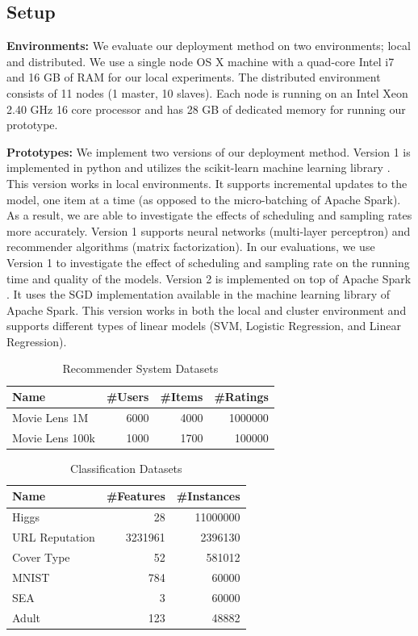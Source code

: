 \documentclass{vldb}
\begin{document}
\subsection{Setup}\label{subsec:setup}
\textbf{Environments:} We evaluate our deployment method on two environments; local and distributed.
We use a single node OS X machine with  a quad-core Intel i7 and 16 GB of RAM for our local experiments.
The distributed environment consists of 11 nodes (1 master, 10 slaves).
Each node is running on an Intel Xeon 2.40 GHz 16 core processor and has 28 GB of dedicated memory for running our prototype.

\textbf{Prototypes:} We implement two versions of our deployment method.
Version 1 is implemented in python and utilizes the scikit-learn machine learning library \cite{sklearn_api}.
This version works in local environments.
It supports incremental updates to the model, one item at a time (as opposed to the micro-batching of Apache Spark).
As a result, we are able to investigate the effects of scheduling and sampling rates more accurately.
Version 1 supports neural networks (multi-layer perceptron) and recommender algorithms (matrix factorization).
In our evaluations, we use Version 1 to investigate the effect of scheduling and sampling rate on the running time and quality of the models.
Version 2 is implemented on top of Apache Spark \cite{zaharia2010spark}.
It uses the SGD implementation available in the machine learning library of Apache Spark.
This version works in both the local and cluster environment and supports different types of linear models (SVM, Logistic Regression, and Linear Regression).

\begin{table}\centering
\begin{tabular}{lrrr}
 \toprule
Name & \#Users & \#Items & \#Ratings
\\\midrule 
Movie Lens 1M  & 6000 & 4000 & 1000000 \\
Movie Lens 100k & 1000 & 1700 & 100000 
\\\bottomrule 
\end{tabular}
\caption{Recommender System Datasets}
\label{table:recommender-systems}
\end{table}

\begin{table}\centering
\begin{tabular}{lrr}
 \toprule
Name & \#Features  & \#Instances 
\\\midrule 
Higgs  & 28 & 11000000 \\
URL Reputation & 3231961 & 2396130 \\
Cover Type & 52 & 581012 \\
MNIST & 784 & 60000 \\
SEA & 3 & 60000 \\
Adult & 123 & 48882
\\\bottomrule 
\end{tabular}
\caption{Classification Datasets}
\end{table}
\end{document}
